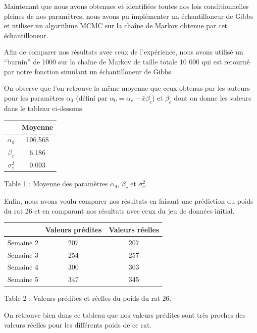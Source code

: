 \documentclass[
]{article}
\begin{document}
Maintenant que nous avons obtenues et identifiées toutes nos lois
conditionnelles pleines de nos paramètres, nous avons pu implémenter un
échantilloneur de Gibbs et utiliser un algorithme MCMC sur la chaîne de
Markov obtenue par cet échantilloneur.

Afin de comparer nos résultats avec ceux de l'expérience, nous avons
utilisé un ``burnin'' de 1000 sur la chaîne de Markov de taille totale
10 000 qui est retourné par notre fonction simulant un échantilloneur de
Gibbs.

On observe que l'on retrouve la même moyenne que ceux obtenus par les
auteurs pour les paramètres \(\alpha_0\) (défini par
\(\alpha_0 = \alpha_c - \bar{x}\beta_c\)) et \(\beta_c\) dont on donne
les valeurs dans le tableau ci-dessous.

\begin{longtable}[]{@{}cc@{}}
\toprule
& Moyenne \\
\midrule
\endhead
\(\alpha_0\) & 106.568 \\
\(\beta_c\) & 6.186 \\
\(\sigma_c^2\) & 0.003 \\
\bottomrule
\end{longtable}

\begin{center}
Table 1 : Moyenne des paramètres $\alpha_0$, $\beta_c$ et $\sigma_c^2$.
\end{center}

Enfin, nous avons voulu comparer nos résultats en faisant une prédiction
du poids du rat 26 et en comparant nos résultats avec ceux du jeu de
données initial.

\begin{longtable}[]{@{}ccc@{}}
\toprule
& Valeurs prédites & Valeurs réelles \\
\midrule
\endhead
Semaine 2 & 207 & 207 \\
Semaine 3 & 254 & 257 \\
Semaine 4 & 300 & 303 \\
Semaine 5 & 347 & 345 \\
\bottomrule
\end{longtable}

\begin{center}
Table 2 : Valeurs prédites et réelles du poids du rat 26.
\end{center}

On retrouve bien dans ce tableau que nos valeurs prédites sont très
proches des valeurs réelles pour les différents poids de ce rat.
\end{document}
